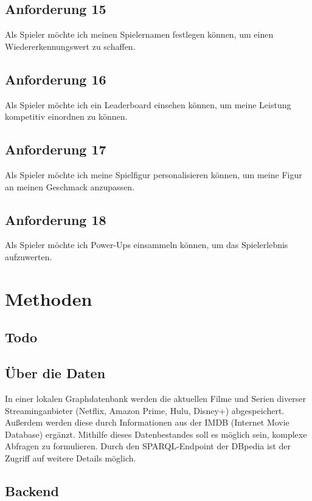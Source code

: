 \documentclass[conference]{IEEEtran}
\begin{document}
\subsection{Anforderung 15}
Als Spieler möchte ich meinen Spielernamen festlegen können, um einen Wiedererkennungswert zu schaffen.

\subsection{Anforderung 16}
Als Spieler möchte ich ein Leaderboard einsehen können, um meine Leistung kompetitiv einordnen zu können.

\subsection{Anforderung 17}
Als Spieler möchte ich meine Spielfigur personalisieren können, um meine Figur an meinen Geschmack anzupassen.

\subsection{Anforderung 18}
Als Spieler möchte ich Power-Ups einsammeln können, um das Spielerlebnis aufzuwerten.

\section{Methoden}

\subsection*{Todo}

\subsection*{Über die Daten}

In einer lokalen Graphdatenbank werden die aktuellen Filme und Serien diverser Streaminganbieter (Netflix, Amazon Prime, Hulu, Disney+) abgespeichert. Außerdem werden diese durch Informationen aus der IMDB (Internet Movie Database) ergänzt. Mithilfe dieses Datenbestandes soll es möglich sein, komplexe Abfragen zu formulieren. Durch den SPARQL-Endpoint der DBpedia ist der Zugriff auf weitere Details möglich.

\subsection*{Backend}
\end{document}
